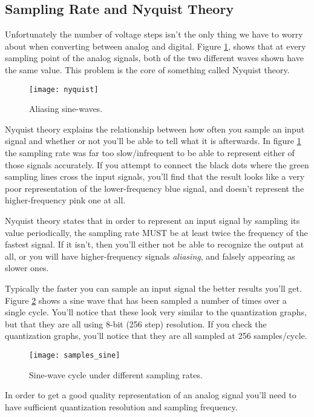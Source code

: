 \documentclass[11pt,fleqn]{book} %
\begin{document}
\subsection{Sampling Rate and Nyquist Theory}
Unfortunately the number of voltage steps isn't the only thing we have to worry about when converting between analog and digital. Figure \ref{nyquist}, shows that at every sampling point of the analog signals, both of the two different waves shown have the same value. This problem is the core of something called Nyquist theory.

\begin{figure}[]
    \centering\texttt{[image: nyquist]}
    \caption{Aliasing sine-waves.}
    \label{nyquist}
\end{figure}

Nyquist theory explains the relationship between how often you sample an input signal and whether or not you'll be able to tell what it is afterwards. In figure \ref{nyquist} the sampling rate was far too slow/infrequent to be able to represent either of those signals accurately. If you attempt to connect the black dots where the green sampling lines cross the input signals, you'll find that the result looks like a very poor representation of the lower-frequency blue signal, and doesn't represent the higher-frequency pink one at all. 

Nyquist theory states that in order to represent an input signal by sampling its value periodically, the sampling rate MUST be at least twice the frequency of the fastest signal. If it isn't, then you'll either not be able to recognize the output at all, or you will have higher-frequency signals \textit{aliasing}, and falsely appearing as slower ones.

Typically the faster you can sample an input signal the better results you'll get. Figure \ref{samples_sine} shows a sine wave that has been sampled a number of times over a single cycle. You'll notice that these look very similar to the quantization graphs, but that they are all using 8-bit (256 step) resolution. If you check the quantization graphs, you'll notice that they are all sampled at 256 samples/cycle. 

\begin{figure}[]
    \centering\texttt{[image: samples\_sine]}
    \caption{Sine-wave cycle under different sampling rates.}
    \label{samples_sine}
\end{figure}

 In order to get a good quality representation of an analog signal you'll need to have sufficient quantization resolution and sampling frequency. 
 
\end{document}
